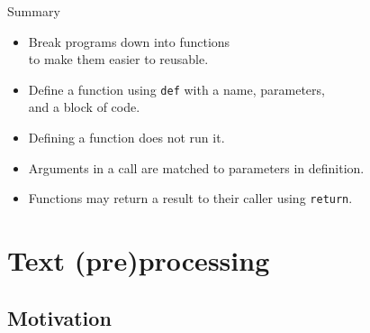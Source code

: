 \documentclass[aspectratio=169,usenames,dvipsnames]{beamer}
\begin{document}

\begin{frame}{Summary}
    \begin{itemize}
        \item Break programs down into functions \\
            to make them easier to reusable.
        \item Define a function using \lstinline{def} with a name, parameters,\\
            and a block of code.
        \item Defining a function does not run it.
        \item Arguments in a call are matched to parameters in definition.
        \item Functions may return a result to their caller using
            \lstinline{return}.
    \end{itemize}
\end{frame}





\section{Text (pre)processing}
\subsection{Motivation}
\frame{\tableofcontents[currentsection]}

\end{document}
